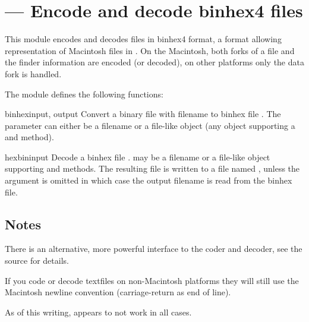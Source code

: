 \section{ ---
         Encode and decode binhex4 files}



This module encodes and decodes files in binhex4 format, a format
allowing representation of Macintosh files in \ASCII{}. On the Macintosh,
both forks of a file and the finder information are encoded (or
decoded), on other platforms only the data fork is handled.

The  module defines the following functions:

\begin{funcdesc}{binhex}{input, output}
Convert a binary file with filename  to binhex file
. The  parameter can either be a filename or a
file-like object (any object supporting a  and
 method).
\end{funcdesc}

\begin{funcdesc}{hexbin}{input}
Decode a binhex file .  may be a filename or a
file-like object supporting  and  methods.
The resulting file is written to a file named , unless the
argument is omitted in which case the output filename is read from the
binhex file.
\end{funcdesc}


\begin{seealso}
\end{seealso}


\subsection{Notes \label{binhex-notes}}

There is an alternative, more powerful interface to the coder and
decoder, see the source for details.

If you code or decode textfiles on non-Macintosh platforms they will
still use the Macintosh newline convention (carriage-return as end of
line).

As of this writing,  appears to not work in all
cases.

